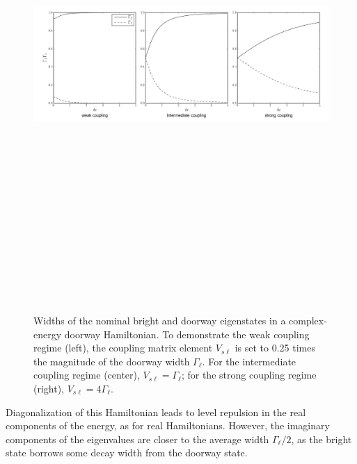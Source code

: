 \documentclass[12pt]{mitthesis}
\begin{document}
\begin{figure}
  \caption{Widths of the nominal bright and doorway eigenstates in a
    complex-energy doorway Hamiltonian. To demonstrate the weak
    coupling regime (left), the coupling matrix element $V_{s\ell}$ is
    set to 0.25 times the magnitude of the doorway width
    $\Gamma_{\ell}$. For the intermediate coupling regime (center),
    $V_{s\ell}=\Gamma_{\ell}$; for the strong coupling regime (right),
    $V_{s\ell}=4\Gamma_{\ell}$.}
  \label{fig:complex-widths}
  \centering
  \includegraphics[angle=90, height=7.4in]{complex-widths.png}
\end{figure}

Diagonalization of this Hamiltonian leads to level repulsion in the
real components of the energy, as for real Hamiltonians.  However, the
imaginary components of the eigenvalues are closer to the average
width $\Gamma_{\ell}/2$, as the bright state borrows some decay width
from the doorway state.
\end{document}
